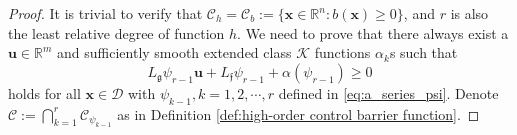 \documentclass[letterpaper, 10 pt, journal, twoside]{IEEEtran}
\theoremstyle{plain}
\newcommand{\myvar}[1]{\bm{#1}}
\newcommand{\myset}[1]{\mathscr{#1}}
\begin{document}
\begin{proof}
  It is trivial to verify that $ \myset{C}_{h} = \myset{C}_{b}:=\{\myvar{x} \in \mathbb{R}^n: b(\myvar{x})\ge 0\} $, and $r$ is also the least relative degree of function $h$. We need to prove that there always exist a $\myvar{u} \in \mathbb{R}^m$ and sufficiently smooth extended class $\mathcal{K}$ functions $\alpha_{k}$s such that 
\begin{equation} \label{eq:cbf_constraint}
    L_{\mathfrak{g}} \psi_{r-1} \myvar{u} + L_{\mathfrak{f}} \psi_{r-1} + \alpha(\psi_{r-1}) \ge 0
\end{equation}
 holds for all $\myvar{x}\in \myset{D}$ with $\psi_{k-1}, k =  1,2, \cdots, r$ defined in \eqref{eq:a_series_psi}. Denote    $ \myset{C}:=\bigcap_{k = 1}^{r} \myset{C}_{\psi_{k-1}}$ as in Definition \ref{def:high-order control barrier function}.
 

\end{proof}
\end{document}
